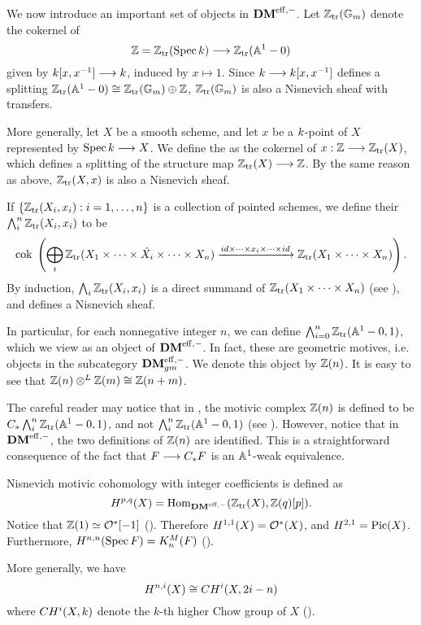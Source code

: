 We now introduce an important set of objects in $\mathbf{DM}^{\mathrm{eff},-}$. Let 
$\mathbb{Z}_{\mathrm{tr}}(\mathbb{G}_m)$ denote the cokernel of
\[
   \mathbb{Z} = \mathbb{Z}_{\mathrm{tr}}(\mathrm{Spec}\, k) \longrightarrow \mathbb{Z}_{\mathrm{tr}}(\mathbb{A}^1 - 0)
\]
given by $k [x, x^{-1}] \longrightarrow k$, induced by
$x \mapsto 1$. Since $k \longrightarrow k[x, x^{-1}]$
defines a splitting $\mathbb{Z}_{\mathrm{tr}}(\mathbb{A}^1 - 0) \cong \mathbb{Z}_{\mathrm{tr}}(\mathbb{G}_m) \oplus \mathbb{Z}$,
$\mathbb{Z}_{\mathrm{tr}}(\mathbb{G}_m)$ is also a Nisnevich sheaf with transfers. 

More generally, let $X$ be a smooth scheme, and let $x$ be a 
$k$-point of $X$ represented by $\mathrm{Spec}\, k \longrightarrow X$. We 
define the  as the 
cokernel of $x: \mathbb{Z} \longrightarrow \mathbb{Z}_{\mathrm{tr}}(X)$, which defines a splitting of the 
structure map $\mathbb{Z}_{\mathrm{tr}}(X) \longrightarrow \mathbb{Z}$. By the same reason as above, 
$\mathbb{Z}_{\mathrm{tr}}(X, x)$ is also a Nisnevich sheaf.

If $\{\mathbb{Z}_{\mathrm{tr}}(X_i, x_i) : i = 1,\dots, n\}$ is a collection of 
pointed schemes, we define their  $\bigwedge_i^n
\mathbb{Z}_{\mathrm{tr}}(X_i, x_i)$ to be
\[
\mathrm{cok}\; \left( \bigoplus_i \mathbb{Z}_{\mathrm{tr}}(X_1 \times \cdots \times \hat{X_i} 
   \times \cdots \times X_n) \xrightarrow{id \times \cdots \times 
      x_i \times \cdots \times id} \mathbb{Z}_{\mathrm{tr}}(X_1 \times \cdots \times 
         X_n)\right).
\]
By induction, $\bigwedge_i \mathbb{Z}_{\mathrm{tr}}(X_i, x_i)$ is a direct summand of
$\mathbb{Z}_{\mathrm{tr}}(X_1 \times \cdots \times X_n)$ (see \cite[Lemma 2.13]{MVW}),
and defines a Nisnevich sheaf.

In particular, for each nonnegative integer $n$, we can define 
$\bigwedge_{i = 0}^n \mathbb{Z}_{\mathrm{tr}}(\mathbb{A}^1 - 0, 1)$, which we view as an 
object of $\mathbf{DM}^{\mathrm{eff},-}$. In fact, these are geometric motives, i.e.
objects in the subcategory $\mathbf{DM}^{\mathrm{eff},-}_{gm}$. We denote this object by 
$\mathbb{Z}(n)$. It is easy to see that $\mathbb{Z}(n) \otimes^L \mathbb{Z}(m) \cong 
\mathbb{Z}(n + m)$. 

\begin{rmk}
The careful reader may notice that in \cite{MVW}, the motivic 
complex $\mathbb{Z}(n)$ is defined to be $C_{*} \bigwedge_i^n \mathbb{Z}_{\mathrm{tr}}(\mathbb{A}^1 
- 0, 1)$, and not $\bigwedge_i^n \mathbb{Z}_{\mathrm{tr}}(\mathbb{A}^1 - 0, 1)$ (see 
\cite[Def. 3.1]{MVW}). However, notice that in $\mathbf{DM}^{\mathrm{eff},-}$, the
two definitions of $\mathbb{Z}(n)$ are identified. This is a 
straightforward consequence of the fact that $F \longrightarrow C_{*} F$ is
an $\mathbb{A}^1$-weak equivalence.
\end{rmk}

\begin{rmk}\label{rmk_mot_coh}
Nisnevich motivic cohomology with integer coefficients is defined
as
\[
H^{p, q}(X) = \mathrm{Hom}_{\mathbf{DM}^{\mathrm{eff},-}}(\mathbb{Z}_{\mathrm{tr}}(X), \mathbb{Z}(q)[p]).
\]
Notice that $\mathbb{Z}(1) \simeq \mathcal{O}^*[-1]$ (\cite[Theorem 4.1]{MVW}).
Therefore $H^{1,1}(X) = \mathcal{O}^*(X)$, and $H^{2,1} = \mathrm{Pic}(X)$.
Furthermore, $H^{n,n}(\mathrm{Spec}\, F) = K^M_n(F)$ 
(\cite[Theorem 5.1]{MVW}).

More generally, we have
\[
H^{n, i}(X) \cong CH^i(X, 2i - n)
\]
where $CH^i(X, k)$ denote the $k$-th higher Chow group of $X$
(\cite[19.1]{MVW}).
\end{rmk}

